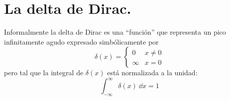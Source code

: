 
\section{La delta de Dirac.}
Informalmente la delta de Dirac es una \enquote{función} que representa un pico infinitamente agudo expresado simbólicamente por
\begin{equation}
\delta (x) = \begin{cases}
0 & x \neq 0 \\
\infty & x = 0
\end{cases}
\label{eq:ecuacion_delta_01}
\end{equation}
pero tal que la integral de $\delta (x)$ está normalizada a la unidad:
\begin{equation}
\int_{-\infty}^{\infty} \delta (x) \: \dd{x} = 1 
\label{eq:ecuacion_delta_02}
\end{equation}

